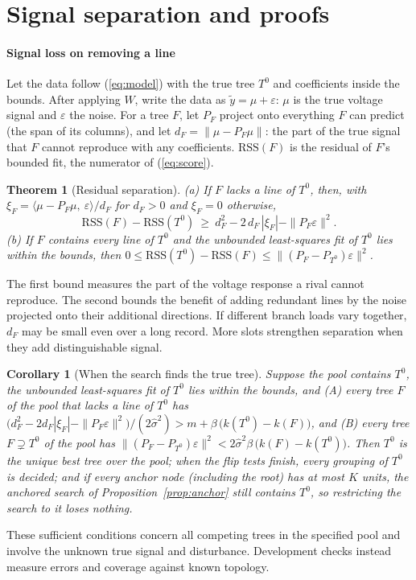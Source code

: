 \documentclass[journal,onecolumn,11pt]{IEEEtran}
\newtheorem{theorem}{Theorem}
\newtheorem{corollary}{Corollary}
\begin{document}
\appendices
\section{Signal separation and proofs}\label{app:separation}
\paragraph*{Signal loss on removing a line} Let the data
follow (\ref{eq:model}) with the true tree $T^0$ and coefficients inside the bounds. After applying $W$, write the data as
$\tilde y=\mu+\varepsilon$: $\mu$ is the true voltage signal and $\varepsilon$ the noise. For a tree $F$, let $P_F$ project
onto everything $F$ can predict (the span of its columns), and let $d_F=\|\mu-P_F\mu\|$: the part of the true signal that $F$
cannot reproduce with any coefficients. $\mathrm{RSS}(F)$ is the residual of $F$'s bounded fit, the numerator of
(\ref{eq:score}).
\begin{theorem}[Residual separation]\label{thm:cost}
(a) If $F$ lacks a line of $T^0$, then, with $\xi_F=\langle\mu-P_F\mu,\ \varepsilon\rangle/d_F$ for $d_F>0$ and $\xi_F=0$ otherwise,
\[
\mathrm{RSS}(F)-\mathrm{RSS}(T^0)\ \ge\ d_F^2-2\,d_F\,|\xi_F|-\|P_F\varepsilon\|^2 .
\]
(b) If $F$ contains every line of $T^0$ and the unbounded least-squares fit of $T^0$ lies within the bounds, then
$0\le\mathrm{RSS}(T^0)-\mathrm{RSS}(F)\le\|(P_F-P_{T^0})\varepsilon\|^2$.
\end{theorem}
The first bound measures the part of the voltage response a rival cannot reproduce. The second bounds the benefit of
adding redundant lines by the noise projected onto their additional directions. If different branch loads vary together,
$d_F$ may be small even over a long record. More slots strengthen separation when they add distinguishable signal.

\begin{corollary}[When the search finds the true tree]\label{cor:truth}
Suppose the pool contains $T^0$, the unbounded least-squares fit of $T^0$ lies within the bounds, and (A) every tree $F$ of
the pool that lacks a line of $T^0$ has
$\big(d_F^2-2d_F|\xi_F|-\|P_F\varepsilon\|^2\big)/(2\hat\sigma^2)>m+\beta\,\big(k(T^0)-k(F)\big)$, and (B) every tree
$F\supsetneq T^0$ of the pool has $\|(P_F-P_{T^0})\varepsilon\|^2<2\hat\sigma^2\beta\,\big(k(F)-k(T^0)\big)$. Then $T^0$ is the unique best tree over the pool;
when the flip tests finish, every grouping of $T^0$ is decided; and if every anchor node (including the root) has at most $K$ units, the anchored
search of Proposition~\ref{prop:anchor} still contains $T^0$, so restricting the search to it loses nothing.
\end{corollary}
These sufficient conditions concern all competing trees in the specified pool and involve the unknown true signal and
disturbance. Development checks instead measure errors and coverage against known topology.
\end{document}
